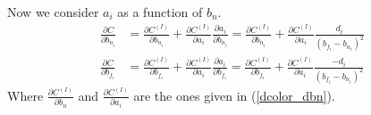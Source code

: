 \documentclass{article}
\begin{document}
\begin{appendices}
    Now we consider $a_i$ as a function of $b_n$.
    \begin{align}
        \frac{\partial C}{\partial b_{n_i}} & = \frac{\partial C^{(I)}}{\partial b_{n_i}} + \frac{\partial C^{(I)}}{\partial a_i} \frac{\partial a_i}{\partial b_{n_i}}
         = \frac{\partial C^{(I)}}{\partial b_{n_i}} + \frac{\partial C^{(I)}}{\partial a_i} \frac{d_i}{(b_{f_i} - b_{n_i})^2} \\
        \frac{\partial C}{\partial b_{f_i}} & = \frac{\partial C^{(I)}}{\partial b_{f_i}} + \frac{\partial C^{(I)}}{\partial a_i} \frac{\partial a_i}{\partial b_{f_i}}
         = \frac{\partial C^{(I)}}{\partial b_{f_i}} + \frac{\partial C^{(I)}}{\partial a_i} \frac{- d_i}{(b_{f_i} - b_{n_i})^2}
    \end{align}
    Where $\frac{\partial C^{(I)}}{\partial b_n}$ and $\frac{\partial C^{(I)}}{\partial a_i}$ are the ones given in (\ref{dcolor_dbn}).

\end{appendices}
\end{document}
